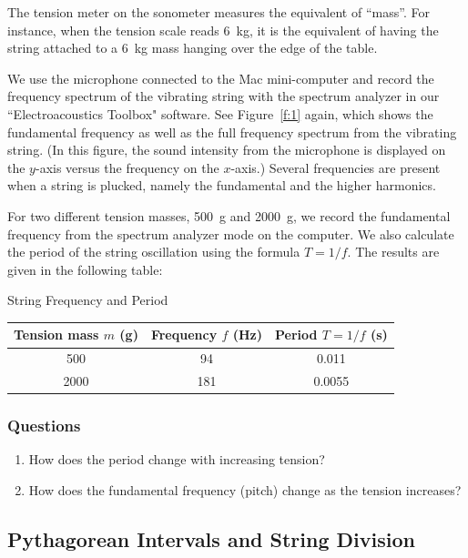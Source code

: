 \documentclass[11pt]{NSF}
\def\ben{\begin{enumerate}}
\def\een{\end{enumerate}}
\def\i{\item{}}
\begin{document}
The tension meter on the sonometer measures the equivalent of ``mass”. 
For instance, when the tension scale reads 6~kg, it is the equivalent 
of having the string attached to a 6~kg mass hanging over the edge 
of the table.

We use the microphone connected to the Mac mini-computer and 
record the frequency spectrum of the vibrating string with the 
spectrum analyzer in our ``Electroacoustics Toolbox" software. 
See Figure~\ref{f:1} again, which shows the fundamental frequency 
as well as the full frequency spectrum from the vibrating string. 
(In this figure, the sound intensity from the microphone is
displayed on the $y$-axis versus the frequency on the $x$-axis.) 
Several frequencies are present when a string is plucked, namely 
the fundamental and the higher harmonics.

For two different tension masses, 500~g and 2000~g, we record the 
fundamental frequency from the spectrum analyzer mode on the computer.
We also calculate the period of the string oscillation using the 
formula $T= 1/f$.
The results are given in the following table:
%
\begin{table}[hbtp]
\begin{center}
String Frequency and Period\\
\begin{tabular}{| c | c | c | }
\hline
Tension mass $m$ (g) & Frequency $f$ (Hz) & Period $T=1/f$ (s) \\
\hline
500 & 94 & 0.011 \\
\hline
2000 & 181 & 0.0055 \\
\hline
\end{tabular}
\label{t:1}
\end{center}
\end{table}
%
\subsubsection*{Questions}
%
\ben
\i How does the period change with increasing tension? 

\i How does the fundamental frequency (pitch) change as the tension 
increases?
\een

\subsection{Pythagorean Intervals and String Division}
\end{document}
